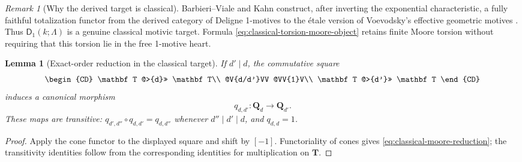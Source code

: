 \documentclass[11pt]{article}
\newtheorem{lemma}[theorem]{Lemma}
\theoremstyle{remark}
\newtheorem{remark}[theorem]{Remark}
\begin{document}
\begin{remark}[Why the derived target is classical]
\label{rem:bvk-classical-target}
Barbieri--Viale and Kahn construct, after inverting the exponential characteristic, a
fully faithful totalization functor from the derived category of Deligne 1-motives to the
\'etale version of Voevodsky's effective geometric motives
\cite{BarbieriVialeKahn2016}.  Thus $\mathsf D_1(k;\Lambda)$ is a genuine classical
motivic target.  Formula \eqref{eq:classical-torsion-moore-object} retains finite Moore
torsion without requiring that this torsion lie in the free 1-motive heart.
\end{remark}

\begin{lemma}[Exact-order reduction in the classical target]
\label{lem:classical-moore-order-reduction}
If $d'\mid d$, the commutative square
\[
\begin{CD}
 \mathbf T @>{d}>> \mathbf T\\
 @V{d/d'}VV @VV{1}V\\
 \mathbf T @>{d'}>> \mathbf T
\end{CD}
\]
induces a canonical morphism
\begin{equation}\label{eq:classical-moore-reduction}
 \boxed{q_{d,d'}:\mathbf Q_d\longrightarrow\mathbf Q_{d'}.}
\end{equation}
These maps are transitive:
$q_{d',d''}\circ q_{d,d'}=q_{d,d''}$ whenever $d''\mid d'\mid d$, and
$q_{d,d}=1$.
\end{lemma}

\begin{proof}
Apply the cone functor to the displayed square and shift by $[-1]$.  Functoriality of
cones gives \eqref{eq:classical-moore-reduction}; the transitivity identities follow from
the corresponding identities for multiplication on $\mathbf T$.
\end{proof}
\end{document}

